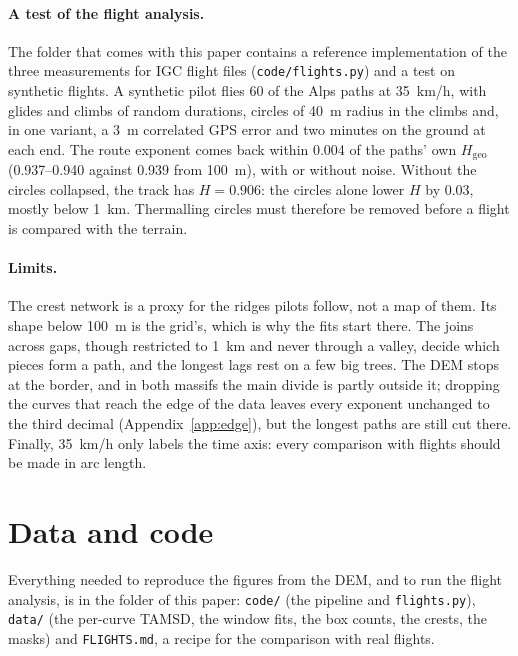 \documentclass[11pt,a4paper]{article}
\newcommand{\Hgeo}{H_{\mathrm{geo}}}
\newcommand{\code}[1]{\texttt{#1}}
\begin{document}
\paragraph{A test of the flight analysis.}
The folder that comes with this paper contains a reference implementation of
the three measurements for IGC flight files (\code{code/flights.py}) and a
test on synthetic flights. A synthetic pilot flies 60 of the Alps paths at
35~km/h, with glides and climbs of random durations, circles of 40~m radius in
the climbs and, in one variant, a 3~m correlated GPS error and two minutes on
the ground at each end. The route exponent comes back within 0.004 of the
paths' own $\Hgeo$ (0.937--0.940 against 0.939 from 100~m), with or without
noise. Without the circles collapsed, the track has $H = 0.906$: the circles
alone lower $H$ by 0.03, mostly below 1~km. Thermalling circles must
therefore be removed before a flight is compared with the terrain.

\paragraph{Limits.}
The crest network is a proxy for the ridges pilots follow, not a map of them.
Its shape below 100~m is the grid's, which is why the fits start there. The
joins across gaps, though restricted to 1~km and never through a valley,
decide which pieces form a path, and the longest lags rest on a few big trees.
The DEM stops at the border, and in both massifs the main divide is partly
outside it; dropping the curves that reach the edge of the data leaves every
exponent unchanged to the third decimal (Appendix~\ref{app:edge}), but the
longest paths are still cut there. Finally, 35~km/h only labels the time axis:
every comparison with flights should be made in arc length.

\section*{Data and code}
Everything needed to reproduce the figures from the DEM, and to run the
flight analysis, is in the folder of this paper: \code{code/} (the pipeline and
\code{flights.py}), \code{data/} (the per-curve TAMSD, the window fits, the box
counts, the crests, the masks) and \code{FLIGHTS.md}, a recipe for the
comparison with real flights.
\end{document}
